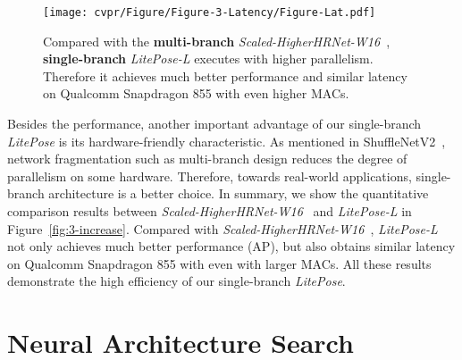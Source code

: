 \documentclass[10pt,twocolumn,letterpaper]{article}
\begin{document}
\begin{figure}
\centering
	\texttt{[image: cvpr/Figure/Figure-3-Latency/Figure-Lat.pdf]}
\caption{Compared with the \textbf{multi-branch} \textit{Scaled-HigherHRNet-W16}~\cite{cheng2020higherhrnet}, \textbf{single-branch} \textit{LitePose-L} executes with higher parallelism. Therefore it achieves much better performance and similar latency on Qualcomm Snapdragon 855 with even higher MACs.} 
\label{fig:3-latency}
\end{figure}
 
Besides the performance, another important advantage of our single-branch \textit{LitePose} is its hardware-friendly characteristic. As mentioned in ShuffleNetV2~\cite{ma2018shufflenet}, network fragmentation such as multi-branch design reduces the degree of parallelism on some hardware. Therefore, towards real-world applications, single-branch architecture is a better choice. In summary, we show the quantitative comparison results between \textit{Scaled-HigherHRNet-W16}~\cite{cheng2020higherhrnet} and \textit{LitePose-L} in Figure~\ref{fig:3-increase}. Compared with \textit{Scaled-HigherHRNet-W16}~\cite{cheng2020higherhrnet}, \textit{LitePose-L} not only achieves much better performance (AP), but also obtains similar latency on Qualcomm Snapdragon 855  with even with larger MACs. All these results demonstrate the high efficiency of our single-branch \textit{LitePose}.  \section{Neural Architecture Search}
\label{sec:4.3}
\end{document}
